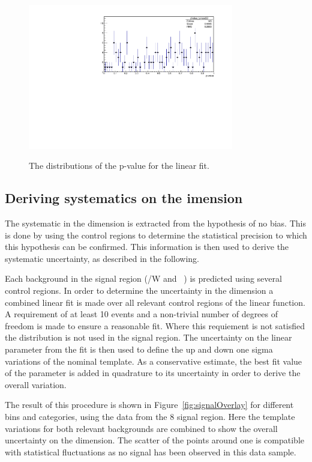 \begin{figure}[h!]
  \centering
    \includegraphics[width=0.8\textwidth]{figures/template/linear/pValueAll.pdf}
  \\
  \caption{\label{fig:pValues} The distributions of the p-value for the linear fit.} 
\end{figure}
\subsection{Deriving systematics on the \texorpdfstring{\mht} dimension}
\label{sec:systMhtDimension}
The systematic in the \mht dimension is extracted from the hypothesis
of no bias. This is done by using the control regions 
to determine the statistical precision to which this hypothesis can
be confirmed. This information is then used to derive the systematic 
uncertainty, as described in the following. 

Each background in the signal region (\ttbar/W  and \zInv~) is predicted 
using several control regions. In order to determine the uncertainty in
the \mht dimension a combined linear fit is made over all relevant control regions
of the linear function. A requirement of at least 10 events and a non-trivial
number of degrees of freedom is made to ensure a reasonable fit. Where this
requiement is not satisfied the \mht distribution is not used in the signal region.
The uncertainty on the linear parameter from the fit is then
used to define the up and down one sigma variations of the nominal template.
As a conservative estimate, the best fit value of the parameter is 
added in quadrature to its uncertainty in order to derive the overall variation.

The result of this procedure is shown in Figure~\ref{fig:signalOverlay} for different 
\scalht bins and categories, using the data from the 8 \TeV signal region. 
Here the template variations for both relevant backgrounds are combined to show 
the overall uncertainty on the \mht dimension. The scatter of the points around 
one is compatible with statistical fluctuations
as no signal has been observed in this data sample.

